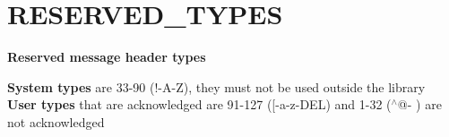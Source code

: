 \hypertarget{group__RESERVED__TYPES}{}\section{R\+E\+S\+E\+R\+V\+E\+D\+\_\+\+T\+Y\+P\+ES}
\label{group__RESERVED__TYPES}
{\bfseries Reserved message header types}

{\bfseries System types} are 33-\/90 (\textquotesingle{}!\textquotesingle{}-\/A\textquotesingle{}-\/\textquotesingle{}Z\textquotesingle{}), they must not be used outside the library~\newline
 {\bfseries User types} that are acknowledged are 91-\/127 (\textquotesingle{}\mbox{[}\textquotesingle{}-\/\textquotesingle{}a\textquotesingle{}-\/\textquotesingle{}z\textquotesingle{}-\/\textquotesingle{}D\+EL\textquotesingle{}) and 1-\/32 (\textquotesingle{}$^\wedge$@\textquotesingle{}-\/\textquotesingle{} \textquotesingle{}) are not acknowledged~\newline
 